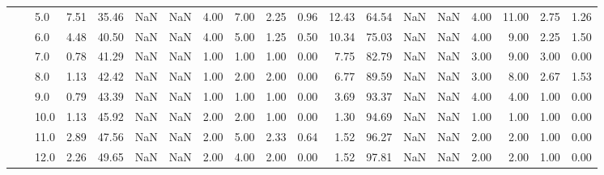 \begin{tabular}{lllrrrrrrrrrrrrrrrr}
          &     & 5.0  &      7.51 &      35.46 &               NaN &                NaN &  4.00 &   7.00 &             2.25 &                         0.96 &     12.43 &      64.54 &               NaN &                NaN &  4.00 &  11.00 &             2.75 &                         1.26 \\
          &     & 6.0  &      4.48 &      40.50 &               NaN &                NaN &  4.00 &   5.00 &             1.25 &                         0.50 &     10.34 &      75.03 &               NaN &                NaN &  4.00 &   9.00 &             2.25 &                         1.50 \\
          &     & 7.0  &      0.78 &      41.29 &               NaN &                NaN &  1.00 &   1.00 &             1.00 &                         0.00 &      7.75 &      82.79 &               NaN &                NaN &  3.00 &   9.00 &             3.00 &                         0.00 \\
          &     & 8.0  &      1.13 &      42.42 &               NaN &                NaN &  1.00 &   2.00 &             2.00 &                         0.00 &      6.77 &      89.59 &               NaN &                NaN &  3.00 &   8.00 &             2.67 &                         1.53 \\
          &     & 9.0  &      0.79 &      43.39 &               NaN &                NaN &  1.00 &   1.00 &             1.00 &                         0.00 &      3.69 &      93.37 &               NaN &                NaN &  4.00 &   4.00 &             1.00 &                         0.00 \\
          &     & 10.0 &      1.13 &      45.92 &               NaN &                NaN &  2.00 &   2.00 &             1.00 &                         0.00 &      1.30 &      94.69 &               NaN &                NaN &  1.00 &   1.00 &             1.00 &                         0.00 \\
          &     & 11.0 &      2.89 &      47.56 &               NaN &                NaN &  2.00 &   5.00 &             2.33 &                         0.64 &      1.52 &      96.27 &               NaN &                NaN &  2.00 &   2.00 &             1.00 &                         0.00 \\
          &     & 12.0 &      2.26 &      49.65 &               NaN &                NaN &  2.00 &   4.00 &             2.00 &                         0.00 &      1.52 &      97.81 &               NaN &                NaN &  2.00 &   2.00 &             1.00 &                         0.00 \\

\end{tabular}

